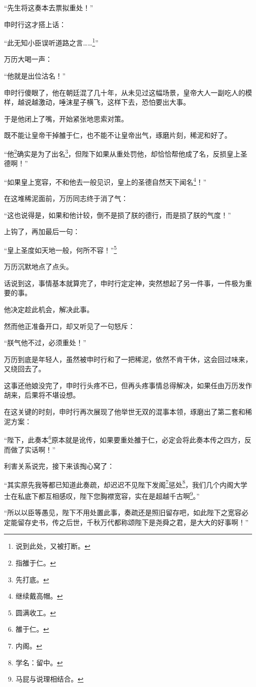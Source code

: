 \begin{multicols}{\theparacolNo}
“先生将这奏本去票拟重处！”

申时行这才搭上话：

“此无知小臣误听道路之言……\footnote{说到此处，又被打断。}”

万历大喝一声：

“他就是出位沽名！”

申时行傻眼了，他在朝廷混了几十年，从未见过这幅场景，皇帝大人一副吃人的模样，越说越激动，唾沫星子横飞，这样下去，恐怕要出大事。

于是他闭上了嘴，开始紧张地思索对策。

既不能让皇帝干掉雒于仁，也不能不让皇帝出气，琢磨片刻，稀泥和好了。

“他\footnote{指雒于仁。}确实是为了出名\footnote{先打底。}，但陛下如果从重处罚他，却恰恰帮他成了名，反损皇上圣德啊！”

“如果皇上宽容，不和他去一般见识，皇上的圣德自然天下闻名\footnote{继续戴高帽。}！”

在这堆稀泥面前，万历同志终于消了气：

“这也说得是，如果和他计较，倒不是损了朕的德行，而是损了朕的气度！”

上钩了，再加最后一句：

“皇上圣度如天地一般，何所不容！”\footnote{圆满收工。}

万历沉默地点了点头。

话说到这，事情基本就算完了，申时行定定神，突然想起了另一件事，一件极为重要的事。

他决定趁此机会，解决此事。

然而他正准备开口，却又听见了一句怒斥：

“朕气他不过，必须重处！”

万历到底是年轻人，虽然被申时行和了一把稀泥，依然不肯干休，这会回过味来，又绕回去了。

这事还他娘没完了，申时行头疼不已，但再头疼事情总得解决，如果任由万历发作胡来，后果将不堪设想。

在这关键的时刻，申时行再次展现了他举世无双的混事本领，琢磨出了第二套和稀泥方案：

“陛下，此奏本\footnote{雒于仁。}原本就是讹传，如果要重处雒于仁，必定会将此奏本传之四方，反而做了实话啊！”

利害关系说完，接下来该掏心窝了：

“其实原先我等都已知道此奏疏，却迟迟不见陛下发阁\footnote{内阁。}惩处\footnote{学名：留中。}，我们几个内阁大学士在私底下都互相感叹，陛下您胸襟宽容，实在是超越千古啊\footnote{马屁与说理相结合。}。”

“所以以臣等愚见，陛下不用处置此事，奏疏还是照旧留存吧，如此陛下之宽容必定能留存史书，传之后世，千秋万代都称颂陛下是尧舜之君，是大大的好事啊！”


\end{multicols}

